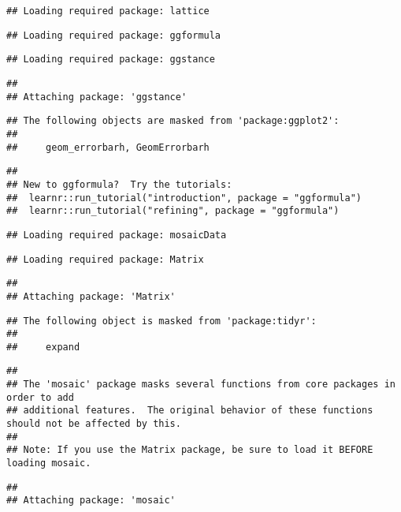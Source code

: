 \documentclass[]{article}
\begin{document}
\begin{verbatim}
## Loading required package: lattice
\end{verbatim}

\begin{verbatim}
## Loading required package: ggformula
\end{verbatim}

\begin{verbatim}
## Loading required package: ggstance
\end{verbatim}

\begin{verbatim}
## 
## Attaching package: 'ggstance'
\end{verbatim}

\begin{verbatim}
## The following objects are masked from 'package:ggplot2':
## 
##     geom_errorbarh, GeomErrorbarh
\end{verbatim}

\begin{verbatim}
## 
## New to ggformula?  Try the tutorials: 
##  learnr::run_tutorial("introduction", package = "ggformula")
##  learnr::run_tutorial("refining", package = "ggformula")
\end{verbatim}

\begin{verbatim}
## Loading required package: mosaicData
\end{verbatim}

\begin{verbatim}
## Loading required package: Matrix
\end{verbatim}

\begin{verbatim}
## 
## Attaching package: 'Matrix'
\end{verbatim}

\begin{verbatim}
## The following object is masked from 'package:tidyr':
## 
##     expand
\end{verbatim}

\begin{verbatim}
## 
## The 'mosaic' package masks several functions from core packages in order to add 
## additional features.  The original behavior of these functions should not be affected by this.
## 
## Note: If you use the Matrix package, be sure to load it BEFORE loading mosaic.
\end{verbatim}

\begin{verbatim}
## 
## Attaching package: 'mosaic'
\end{verbatim}
\end{document}
